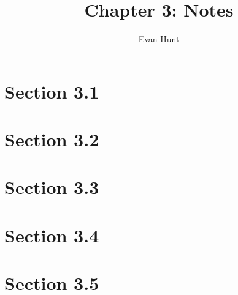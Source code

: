 \documentclass[12pt]{article}
\title{Chapter 3: Notes}
\author{Evan Hunt}
\begin{document}
    \maketitle

    \section[]{Section 3.1}
    \section[]{Section 3.2}
    \section[]{Section 3.3}
    \section[]{Section 3.4}
    \section[]{Section 3.5}
\end{document}
